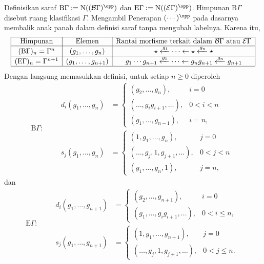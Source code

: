\begin{example}
	Definisikan saraf
	$\mathrm{B}\Gamma:=\mathrm{N}((\mathcal{B}\Gamma)^{\opp})$ dan
	$\mathrm{E}\Gamma:=\mathrm{N}((\mathcal{E}\Gamma)^{\opp})$.
	Himpunan $\mathrm{B}\Gamma$ disebut ruang klasifikasi $\Gamma$. Mengambil
	Penerapan $(\cdots)^{\opp}$ pada dasarnya membalik anak panah dalam definisi saraf
	tanpa mengubah labelnya. Karena itu,
	\begin{equation*}
		\begin{array}{|c|c|c|} \hline
		\text{Himpunan} & \text{Elemen} & \text{Rantai morfisme terkait dalam }\mathcal{B}\Gamma\text{ atau }\mathcal{E}\Gamma \\ \hline
		(\mathrm{B}\Gamma)_n = \Gamma^n & (g_1, \ldots, g_n) & \star \xleftarrow{g_1} \cdots \leftarrow \star \xleftarrow{g_n} \star \\ \hline
		(\mathrm{E}\Gamma)_n = \Gamma^{n+1} & (g_1, \ldots, g_{n+1}) & g_1 \cdots g_{n+1} \xleftarrow{g_1} \cdots \leftarrow g_n g_{n+1} \xleftarrow{g_n} g_{n+1} \\ \hline
		\end{array}
	\end{equation*}
	Dengan langsung memasukkan definisi, untuk setiap $n\geq0$ diperoleh
	\begin{equation*}
		\mathrm{B}\Gamma: \qquad \begin{aligned}
			d_i(g_1, \ldots, g_n) & =
			\begin{cases}
				(g_2, \ldots, g_n), & i = 0 \\
				(\ldots, g_i g_{i+1} , \ldots), & 0 < i < n \\
				(g_1, \ldots, g_{n-1}), & i = n,
			\end{cases} \\
			s_j(g_1, \ldots, g_n) & =
			\begin{cases}
				(1, g_1, \ldots, g_n), & j = 0 \\
				(\ldots, g_j, 1, g_{j+1}, \ldots), & 0 < j < n \\
				(g_1, \ldots, g_n, 1), & j = n,
			\end{cases}
		\end{aligned}
	\end{equation*}
	dan
	\begin{equation*}
		\mathrm{E}\Gamma: \qquad \begin{aligned}
			d_i(g_1, \ldots, g_{n+1}) & =
			\begin{cases}
				(g_2, \ldots, g_{n+1}), & i = 0 \\
				(g_1, \ldots, g_i g_{i+1} , \ldots), & 0 < i \leq n,
			\end{cases} \\
			s_j(g_1, \ldots, g_{n+1}) & =
			\begin{cases}
				(1, g_1, \ldots, g_{n+1}), & j = 0 \\
				(\ldots, g_j, 1, g_{j+1}, \ldots), & 0 < j \leq n.
			\end{cases}
		\end{aligned}
	\end{equation*}


\end{example}
